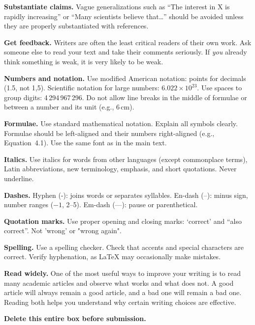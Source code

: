 \documentclass[12pt,a4paper,twocolumn]{article}
\begin{document}
\begin{stylenote}[title={Academic Writing Style Guide — Delete before submission}]
\textbf{Substantiate claims.}
Vague generalizations such as ``The interest in X is rapidly increasing'' or
``Many scientists believe that\ldots'' should be avoided unless they are
properly substantiated with references.

\textbf{Get feedback.}
Writers are often the least critical readers of their own work. Ask someone
else to read your text and take their comments seriously. If \emph{you}
already think something is weak, it is very likely to be weak.

\textbf{Numbers and notation.}
Use modified American notation: points for decimals (1.5, not 1,5).
Scientific notation for large numbers: $6.022 \times 10^{23}$.
Use spaces to group digits: 4\,294\,967\,296. Do not allow line breaks in
the middle of formulae or between a number and its unit (e.g., 6\,cm).

\textbf{Formulae.}
Use standard mathematical notation. Explain all symbols clearly. Formulae
should be left-aligned and their numbers right-aligned (e.g., Equation~4.1).
Use the same font as in the main text.

\textbf{Italics.}
Use italics for words from other languages (except commonplace terms),
Latin abbreviations, new terminology, emphasis, and short quotations.
Never underline.

\textbf{Dashes.}
Hyphen (-): joins words or separates syllables.
En-dash (--): minus sign, number ranges ($-1$, 2--5).
Em-dash (---): pause or parenthetical.

\textbf{Quotation marks.}
Use proper opening and closing marks: `correct' and ``also correct''.
Not 'wrong' or "wrong again".

\textbf{Spelling.}
Use a spelling checker. Check that accents and special characters are
correct. Verify hyphenation, as LaTeX may occasionally make mistakes.

\textbf{Read widely.}
One of the most useful ways to improve your writing is to read many
academic articles and observe what works and what does not. A good article
will always remain a good article, and a bad one will remain a bad one.
Reading both helps you understand why certain writing choices are effective.

\textbf{Delete this entire box before submission.}
\end{stylenote}
\end{document}
